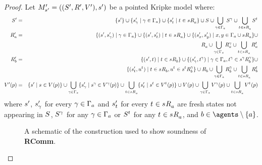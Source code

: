 \begin{proof}
Let $\kPModelAndTupleP{\kStateSP}$ be a pointed Kripke model where:
\begin{eqnarray*}
    \kStatesP &=& \{\kStateSP\} \cup \{\kStateSP_\gamma \mid \gamma \in \Gamma_\agentA\} \cup \{\kStateSP_{\kStateT} \mid \kStateT \in \kSuccessorsA{\kStateS}\} \cup \kStates \cup \bigcup_{\gamma \in \Gamma_\agentA} \kStates[\gamma] \cup \bigcup_{\kStateT \in \kSuccessorsA{\kStateS}} \kStates[\kStateT]\\
    \kAccessibilityPA &=& \{(\kStateSP, \kStateSP_\gamma) \mid \gamma \in \Gamma_\agentA\} \cup \{(\kStateSP, \kStateSP_{\kStateT}) \mid \kStateT \in \kSuccessorsA{\kStateS}\} \cup \{(\kStateSP_x, \kStateSP_y) \mid x, y \in \Gamma_\agentA \cup \kSuccessorsA{\kStateS}\} \cup \\&&\quad \kAccessibilityA \cup \bigcup_{\gamma \in \Gamma_\agentA} \kAccessibilityA[\gamma] \cup \bigcup_{\kStateT \in \kSuccessorsA{\kStateS}} \kAccessibilityA[\kStateT]\\
    \kAccessibilityPB &=& \{(\kStateSP, \kStateT) \mid \kStateT \in \kSuccessorsB{\kStateS}\} \cup \{(\kStateSP_\gamma, \kStateT[\gamma]) \mid \gamma \in \Gamma_\agentA, \kStateT[\gamma] \in \kSuccessorsB[\gamma]{\kStateS[\gamma]}\} \cup \\&&\quad \{(\kStateSP_{\kStateT}, \kStateU[\kStateT]) \mid \kStateT \in \kSuccessorsB{\kStateS}, \kStateU[\kStateT] \in \kSuccessorsB[\gamma]{\kStateS[\kStateT]}\} \cup \kAccessibilityB \cup \bigcup_{\gamma \in \Gamma_\agentA} \kAccessibilityB[\gamma] \cup \bigcup_{\kStateT \in \kSuccessorsA{\kStateS}} \kAccessibilityB[\kStateT]\\
    \kValuationP(\atomP) &=& \{\kStateSP \mid \kStateS \in \kValuation(\atomP)\} \cup \bigcup_{\gamma \in \Gamma_\agentA} \{\kStateSP_\gamma \mid \kStateS[\gamma] \in \kValuation[\gamma](\atomP)\} \cup \bigcup_{\kStateT \in \kSuccessorsA{\kStateS}} \{\kStateSP_{\kStateT} \mid \kStateS[\kStateT] \in \kValuation[\kStateT](\atomP)\} \cup \kValuation(\atomP) \cup \bigcup_{\gamma \in \Gamma_\agentA} \kValuation[\gamma](\atomP) \cup \bigcup_{\kStateT \in \kSuccessorsA{\kStateS}} \kValuation[\kStateT](\atomP)
\end{eqnarray*}
where $\kStateSP$, $\kStateSP_\gamma$ for every $\gamma \in \Gamma_\agentA$ and $\kStateSP_{\kStateT}$ for every $\kStateT \in \kSuccessorsA{\kStateS}$ are fresh states not appearing in $\kStates$, $\kStates[\gamma]$ for any $\gamma \in \Gamma_\agentA$ or $\kStates[\kStateT]$ for any $\kStateT \in \kSuccessorsA{\kStateS}$, and $\agentB \in \agents \setminus \{\agentA\}$.
\begin{figure}
    \caption{A schematic of the construction used to show soundness of {\bf RComm}.}\label{rml-k45-rcomm-construction}
    \centering
    \begin{tikzpicture}[>=stealth',shorten >=1pt,auto,node distance=7em,thick]


\end{tikzpicture}
\end{figure}
\end{proof}
